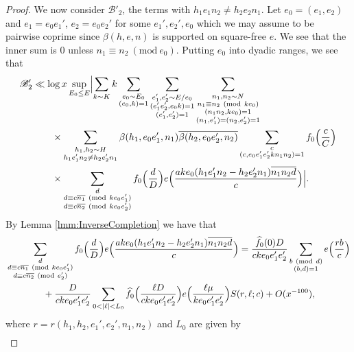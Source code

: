 \documentclass[10pt]{amsart}
\theoremstyle{plain}
\numberwithin{equation}{section}
\newcommand{\Mod}[1]{\ (\mathrm{mod}\ #1)}
\renewcommand{\hat}[1]{\widehat #1}
\begin{document}
\begin{proof}
We now consider $\mathscr{B}'_2$, the terms with $h_1e_1n_2\ne h_2e_2n_1$. Let $e_0=(e_1,e_2)$ and $e_1=e_0e_1'$, $e_2=e_0e_2'$ for some $e_1',e_2',e_0$ which we may assume to be pairwise coprime since $\beta(h,e,n)$ is supported on square-free $e$. We see that the inner sum is 0 unless $n_1\equiv n_2\Mod{e_0}$. Putting $e_0$ into dyadic ranges, we see that
\begin{align*}
\mathscr{B}'_2&\ll \log{x}\sup_{\substack{E_0\le E}}\Bigl|\sum_{\substack{k\sim K}}k\sum_{\substack{e_0\sim E_0\\ (e_0,k)=1}}\sum_{\substack{e_1',e_2'\sim E/e_0\\ (e_1' e_2',e_0k)=1\\ (e_1',e_2')=1}}\sum_{\substack{n_1,n_2\sim N\\ n_1\equiv n_2\Mod{k e_0}\\ (n_1 n_2,k e_0)=1\\ (n_1,e_1')=(n_2,e_2')=1}}\\
&\qquad\times\sum_{\substack{h_1,h_2\sim H\\ h_1e_1'n_2\ne h_2e_2'n_1}}\beta(h_1,e_0 e_1',n_1)\overline{\beta(h_2,e_0 e_2',n_2)}\sum_{\substack{c\\ (c,e_0e_1'e_2' k n_1n_2)=1}}f_0\Bigl(\frac{c}{C}\Bigr)\\
&\qquad \times \sum_{\substack{d\\ d\equiv c\overline{n_1}\Mod{k e_0 e_1'}\\ d\equiv c\overline{n_2} \Mod{k e_0 e_2'}}}f_0\Bigl(\frac{d}{D}\Bigr)e\Bigl(\frac{a k e_0(h_1 e_1' n_2 - h_2 e_2' n_1)\overline{n_1 n_2 d}}{c}\Bigr)\Bigr|.
\end{align*}
By Lemma \ref{lmm:InverseCompletion} we have that
\begin{align*}
&\sum_{\substack{d\\ d\equiv c\overline{n_1}\Mod{k e_0e_1'}\\ d\equiv c\overline{n_2} \Mod{e_2'}}}f_0\Bigl(\frac{d}{D}\Bigr)e\Bigl(\frac{a k e_0(h_1e_1'n_2-h_2e_2'n_1)\overline{n_1n_2d}}{c}\Bigr)=\frac{\hat{f_0}(0)D}{c k e_0 e_1' e_2'}\sum_{\substack{b\Mod{d}\\ (b,d)=1}}e\Bigl(\frac{r b}{c}\Bigr)\\
&\qquad\qquad+\frac{D}{c k e_0e_1'e_2'}\sum_{0<|\ell|<L_0}\hat{f_0}\Bigl(\frac{\ell D}{c k e_0 e_1' e_2'}\Bigr)e\Bigl(\frac{\ell\mu}{k e_0e_1'e_2'}\Bigr)S(r,\ell;c)+O(x^{-100}),
\end{align*}
where $r=r(h_1,h_2,e_1',e_2',n_1,n_2)$ and $L_0$ are given by
\begin{align*}

\end{align*}
\end{proof}
\end{document}
